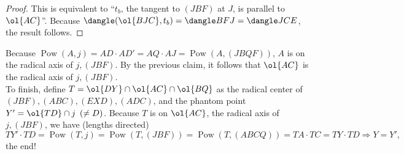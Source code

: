 \documentclass{seto}
\DeclareMathOperator\Pow{Pow}
\begin{document}
\begin{proof}
This is equivalent to ``$t_b$, the tangent to $(JBF)$ at $J$, is parallel to $\ol{AC}$''. Because $\dangle(\ol{BJC},t_b)=\dangle BFJ=\dangle JCE$,
the result follows.
\end{proof}\noindent
Because $\Pow(A,j)=AD\cdot AD'=AQ\cdot AJ=\Pow(A,(JBQF))$, $A$ is on the radical axis of $j, (JBF)$. 
By the previous claim, it follows that $\ol{AC}$ is the radical axis of $j, (JBF)$.\\[4pt]
To finish, define $T=\ol{DY}\cap\ol{AC}\cap\ol{BQ}$ as the radical center of $(JBF),(ABC),(EXD), (ADC)$, 
and the phantom point $Y'=\ol{TD}\cap j\enskip(\neq D)$. Because $T$ is on $\ol{AC}$, the radical axis of $j,(JBF)$, we have (lengths directed)
\[TY'\cdot TD=\Pow(T,j)=\Pow(T,(JBF))=\Pow(T,(ABCQ))=TA\cdot TC=TY\cdot TD\Rightarrow Y=Y',\]
the end!
\end{document}
